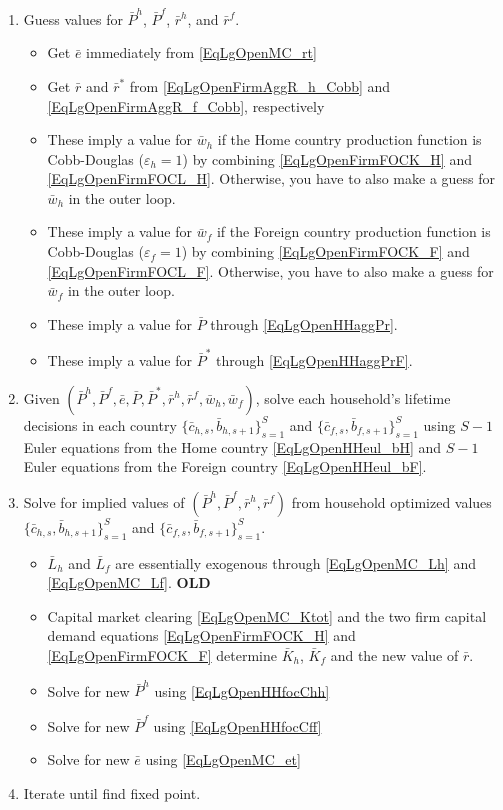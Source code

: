 \documentclass[letterpaper,12pt]{article}
\theoremstyle{definition}
\newcommand\ve{\varepsilon}
\begin{document}
    \begin{enumerate}
      \item Guess values for $\bar{P}^h$, $\bar{P}^f$, $\bar{r}^h$, and $\bar{r}^f$.
      \begin{itemize}
        \item Get $\bar{e}$ immediately from \eqref{EqLgOpenMC_rt}
        \item Get $\bar{r}$ and $\bar{r}^*$ from \eqref{EqLgOpenFirmAggR_h_Cobb} and \eqref{EqLgOpenFirmAggR_f_Cobb}, respectively
        \item These imply a value for $\bar{w}_h$ if the Home country production function is Cobb-Douglas ($\ve_h=1$) by combining \eqref{EqLgOpenFirmFOCK_H} and \eqref{EqLgOpenFirmFOCL_H}. Otherwise, you have to also make a guess for $\bar{w}_h$ in the outer loop.
        \item These imply a value for $\bar{w}_f$ if the Foreign country production function is Cobb-Douglas ($\ve_f=1$) by combining \eqref{EqLgOpenFirmFOCK_F} and \eqref{EqLgOpenFirmFOCL_F}. Otherwise, you have to also make a guess for $\bar{w}_f$ in the outer loop.
        \item These imply a value for $\bar{P}$ through \eqref{EqLgOpenHHaggPr}.
        \item These imply a value for $\bar{P}^*$ through \eqref{EqLgOpenHHaggPrF}.
      \end{itemize}
      \item Given $\left(\bar{P}^h, \bar{P}^f, \bar{e}, \bar{P}, \bar{P}^*, \bar{r}^h, \bar{r}^f, \bar{w}_h, \bar{w}_f\right)$, solve each household's lifetime decisions in each country $\{\bar{c}_{h,s},\bar{b}_{h,s+1}\}_{s=1}^S$ and $\{\bar{c}_{f,s},\bar{b}_{f,s+1}\}_{s=1}^S$ using $S-1$ Euler equations from the Home country \eqref{EqLgOpenHHeul_bH} and $S-1$ Euler equations from the Foreign country \eqref{EqLgOpenHHeul_bF}.
      \item Solve for implied values of $\left(\bar{P}^h, \bar{P}^f, \bar{r}^h, \bar{r}^f\right)$ from household optimized values $\{\bar{c}_{h,s},\bar{b}_{h,s+1}\}_{s=1}^S$ and $\{\bar{c}_{f,s},\bar{b}_{f,s+1}\}_{s=1}^S$.
      \begin{itemize}
        \item $\bar{L}_h$ and $\bar{L}_f$ are essentially exogenous through \eqref{EqLgOpenMC_Lh} and \eqref{EqLgOpenMC_Lf}.
        \textbf{OLD}
        \item Capital market clearing \eqref{EqLgOpenMC_Ktot} and the two firm capital demand equations \eqref{EqLgOpenFirmFOCK_H} and \eqref{EqLgOpenFirmFOCK_F} determine $\bar{K}_h$, $\bar{K}_f$ and the new value of $\bar{r}$.
        \item Solve for new $\bar{P}^h$ using \eqref{EqLgOpenHHfocChh}
        \item Solve for new $\bar{P}^f$ using \eqref{EqLgOpenHHfocCff}
        \item Solve for new $\bar{e}$ using \eqref{EqLgOpenMC_et}
      \end{itemize}
      \item Iterate until find fixed point.
    \end{enumerate}
\end{document}
